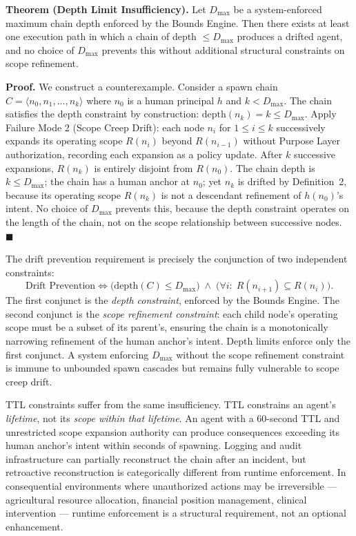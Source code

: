 \medskip
\noindent\textbf{Theorem (Depth Limit Insufficiency).}
Let $D_{\max}$ be a system-enforced maximum chain depth enforced by the Bounds Engine. Then there exists at least one execution path in which a chain of depth $\leq D_{\max}$ produces a drifted agent, and no choice of $D_{\max}$ prevents this without additional structural constraints on scope refinement.

\medskip
\noindent\textbf{Proof.} We construct a counterexample. Consider a spawn chain $C = \langle n_0, n_1, \ldots, n_k \rangle$ where $n_0$ is a human principal $h$ and $k < D_{\max}$. The chain satisfies the depth constraint by construction: $\text{depth}(n_k) = k \leq D_{\max}$. Apply Failure Mode 2 (Scope Creep Drift): each node $n_i$ for $1 \leq i \leq k$ successively expands its operating scope $R(n_i)$ beyond $R(n_{i-1})$ without Purpose Layer authorization, recording each expansion as a policy update. After $k$ successive expansions, $R(n_k)$ is entirely disjoint from $R(n_0)$. The chain depth is $k \leq D_{\max}$; the chain has a human anchor at $n_0$; yet $n_k$ is drifted by Definition~2, because its operating scope $R(n_k)$ is not a descendant refinement of $h(n_0)$'s intent. No choice of $D_{\max}$ prevents this, because the depth constraint operates on the length of the chain, not on the scope relationship between successive nodes. $\blacksquare$

The drift prevention requirement is precisely the conjunction of two independent constraints:
\begin{equation}
\text{Drift Prevention} \iff \bigl( \text{depth}(C) \leq D_{\max} \bigr)\;\land\;\bigl( \forall i:\; R(n_{i+1}) \subseteq R(n_i) \bigr).
\label{eq:drift-prevention-constraint}
\end{equation}
The first conjunct is the \emph{depth constraint}, enforced by the Bounds Engine. The second conjunct is the \emph{scope refinement constraint}: each child node's operating scope must be a subset of its parent's, ensuring the chain is a monotonically narrowing refinement of the human anchor's intent. Depth limits enforce only the first conjunct. A system enforcing $D_{\max}$ without the scope refinement constraint is immune to unbounded spawn cascades but remains fully vulnerable to scope creep drift.

TTL constraints suffer from the same insufficiency. TTL constrains an agent's \emph{lifetime}, not its \emph{scope within that lifetime}. An agent with a 60-second TTL and unrestricted scope expansion authority can produce consequences exceeding its human anchor's intent within seconds of spawning. Logging and audit infrastructure can partially reconstruct the chain after an incident, but retroactive reconstruction is categorically different from runtime enforcement. In consequential environments where unauthorized actions may be irreversible — agricultural resource allocation, financial position management, clinical intervention — runtime enforcement is a structural requirement, not an optional enhancement.

